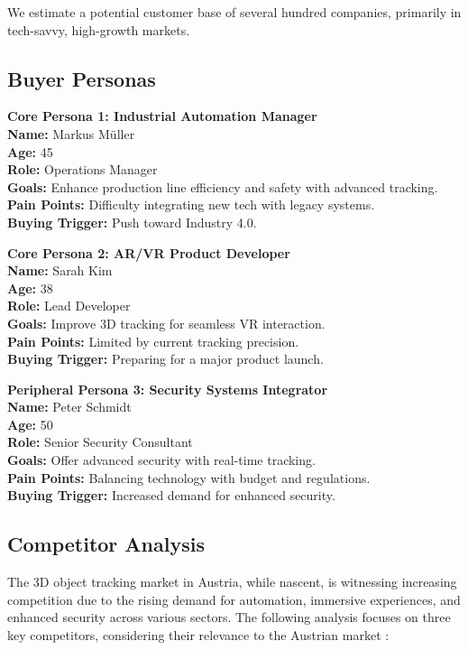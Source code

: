 We estimate a potential customer base of several hundred companies, primarily in tech-savvy, high-growth markets.

\subsection{Buyer Personas}

\textbf{Core Persona 1: Industrial Automation Manager} \\
\textbf{Name:} Markus Müller \\
\textbf{Age:} 45 \\
\textbf{Role:} Operations Manager \\
\textbf{Goals:} Enhance production line efficiency and safety with advanced tracking. \\
\textbf{Pain Points:} Difficulty integrating new tech with legacy systems. \\
\textbf{Buying Trigger:} Push toward Industry 4.0.

\textbf{Core Persona 2: AR/VR Product Developer} \\
\textbf{Name:} Sarah Kim \\
\textbf{Age:} 38 \\
\textbf{Role:} Lead Developer \\
\textbf{Goals:} Improve 3D tracking for seamless VR interaction. \\
\textbf{Pain Points:} Limited by current tracking precision. \\
\textbf{Buying Trigger:} Preparing for a major product launch.

\textbf{Peripheral Persona 3: Security Systems Integrator} \\
\textbf{Name:} Peter Schmidt \\
\textbf{Age:} 50 \\
\textbf{Role:} Senior Security Consultant \\
\textbf{Goals:} Offer advanced security with real-time tracking. \\
\textbf{Pain Points:} Balancing technology with budget and regulations. \\
\textbf{Buying Trigger:} Increased demand for enhanced security.

\subsection{Competitor Analysis}

The 3D object tracking market in Austria, while nascent, is witnessing increasing competition due to the rising demand for automation, immersive experiences, and enhanced security across various sectors. The following analysis focuses on three key competitors, considering their relevance to the Austrian market \cite{businessresearchinsights_3d_motion_capture_market}:

